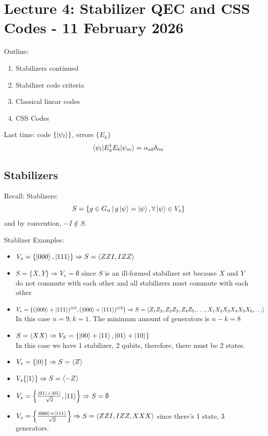 \section{Lecture 4: Stabilizer QEC and CSS Codes - 11 February 2026}
Outline:
\begin{enumerate}[label=(\Roman*)]
    \item Stabilizers continued
    \item Stabilizer code criteria 
    \item Classical linear codes 
    \item CSS Codes
\end{enumerate}
Last time: code $\{\ket{\psi_l}\}$, errors $\{E_k\}$ \\
\begin{equation}
    \braket{\psi_l | E_a^\dagger E_b |\psi_m} = \alpha_{ab} \delta_{lm}
\end{equation}

\subsection{Stabilizers}
Recall: Stablizers:
\begin{equation}
    S = \{g \in G_n \,|\, g\ket{\psi} = \ket{\psi}, \forall \ket{\psi} \in V_s \}
\end{equation}
and by convention, $-I \notin S$. 
\begin{example}
    Stablizer Examples:
    \begin{itemize}
        \item $V_s = \{\ket{000}, \ket{111}\} \Rightarrow S = \langle ZZI, IZZ \rangle$
        \item $S = \{X,Y\} \Rightarrow V_s = \emptyset$ since $S$ is an ill-formed stabilizer set because $X$ and $Y$ do not commute with each other and all stabilizers must commute with each other 
        \item $V_s = \{(\ket{000} + \ket{111})^{\otimes 3}, (\ket{000} + \ket{111})^{\otimes 3}\} \Rightarrow S = \langle Z_1Z_2, Z_2Z_3, Z_4Z_5,\ldots, X_1X_2X_3X_4X_5X_6, \ldots \rangle$ \\
        In this case $n = 9, k= 1$. The minimum amount of generators is $n-k = 8$ 
        \item $S = \langle XX\rangle \Rightarrow V_S = \{\ket{00} + \ket{11}, \ket{01} + \ket{10}\}$ \\ 
        In this case we have 1 stabilizer, 2 qubits, therefore, there must be 2 states.
        \item $V_s = \{\ket{0}\} \Rightarrow S = \langle Z\rangle$
        \item $V_s \{\ket{1}\} \Rightarrow S = \langle -Z \rangle$
        \item $V_s = \left\{\frac{\ket{01} + \ket{01}}{\sqrt{2}}, \ket{11}\right\} \Rightarrow S = \emptyset$
        \item $V_s = \left\{\frac{\ket{000} + \ket{111}}{\sqrt{2}}\right\} \Rightarrow S= \langle ZZI, IZZ, XXX\rangle$ since there's 1 state, 3 generators. 
    \end{itemize}
\end{example}


